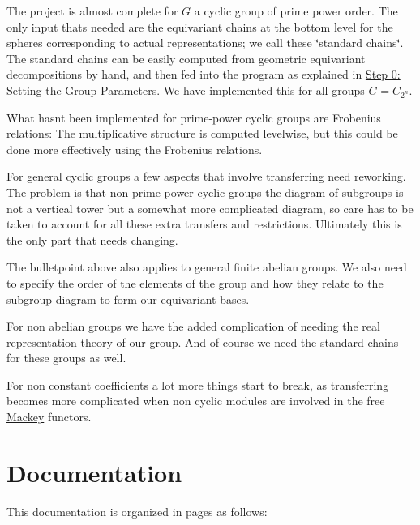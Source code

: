 \begin{DoxyItemize}
\item The project is almost complete for $G$ a cyclic group of prime power order. The only input that\textquotesingle{}s needed are the equivariant chains at the bottom level for the spheres corresponding to actual representations; we call these \char`\"{}standard chains\char`\"{}. The standard chains can be easily computed from geometric equivariant decompositions by hand, and then fed into the program as explained in \hyperlink{use_how}{Step 0\+: Setting the Group Parameters}. We have implemented this for all groups $G=C_{2^n}$.
\item What hasn\textquotesingle{}t been implemented for prime-\/power cyclic groups are Frobenius relations\+: The multiplicative structure is computed levelwise, but this could be done more effectively using the Frobenius relations.
\item For general cyclic groups a few aspects that involve transferring need reworking. The problem is that non prime-\/power cyclic groups the diagram of subgroups is not a vertical tower but a somewhat more complicated diagram, so care has to be taken to account for all these extra transfers and restrictions. Ultimately this is the only part that needs changing.
\item The bulletpoint above also applies to general finite abelian groups. We also need to specify the order of the elements of the group and how they relate to the subgroup diagram to form our equivariant bases.
\item For non abelian groups we have the added complication of needing the real representation theory of our group. And of course we need the standard chains for these groups as well.
\item For non constant coefficients a lot more things start to break, as transferring becomes more complicated when non cyclic modules are involved in the free \hyperlink{namespaceMackey}{Mackey} functors.
\end{DoxyItemize}\hypertarget{index_doc}{}\section{Documentation}\label{index_doc}
This documentation is organized in pages as follows\+:


